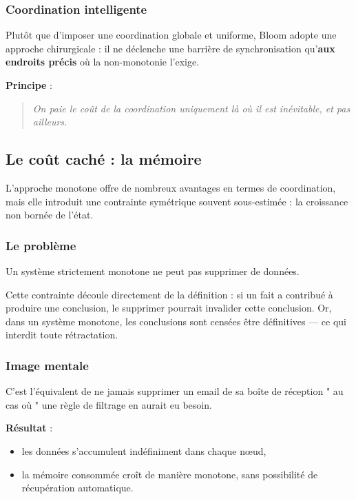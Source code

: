 \documentclass[12pt,a4paper]{article}
\begin{document}
\subsubsection{Coordination intelligente}

Plutôt que d'imposer une coordination globale et uniforme, Bloom adopte une
approche chirurgicale : il ne déclenche une barrière de synchronisation
qu'\textbf{aux endroits précis} où la non-monotonie l'exige.

\bigskip

\textbf{Principe} :
\begin{quote}
\textit{On paie le coût de la coordination uniquement là où il est inévitable,
et pas ailleurs.}
\end{quote}

\subsection{Le coût caché : la mémoire}

L'approche monotone offre de nombreux avantages en termes de coordination,
mais elle introduit une contrainte symétrique souvent sous-estimée : la
croissance non bornée de l'état.

\subsubsection{Le problème}

Un système strictement monotone ne peut pas supprimer de données.

Cette contrainte découle directement de la définition : si un fait a contribué
à produire une conclusion, le supprimer pourrait invalider cette conclusion.
Or, dans un système monotone, les conclusions sont censées être définitives
— ce qui interdit toute rétractation.

\subsubsection{Image mentale}

C'est l'équivalent de ne jamais supprimer un email de sa boîte de réception
" au cas où " une règle de filtrage en aurait eu besoin.

\bigskip



\textbf{Résultat} :
\begin{itemize}
    \item les données s'accumulent indéfiniment dans chaque nœud,
    \item la mémoire consommée croît de manière monotone, sans possibilité
    de récupération automatique.
\end{itemize}
\end{document}
